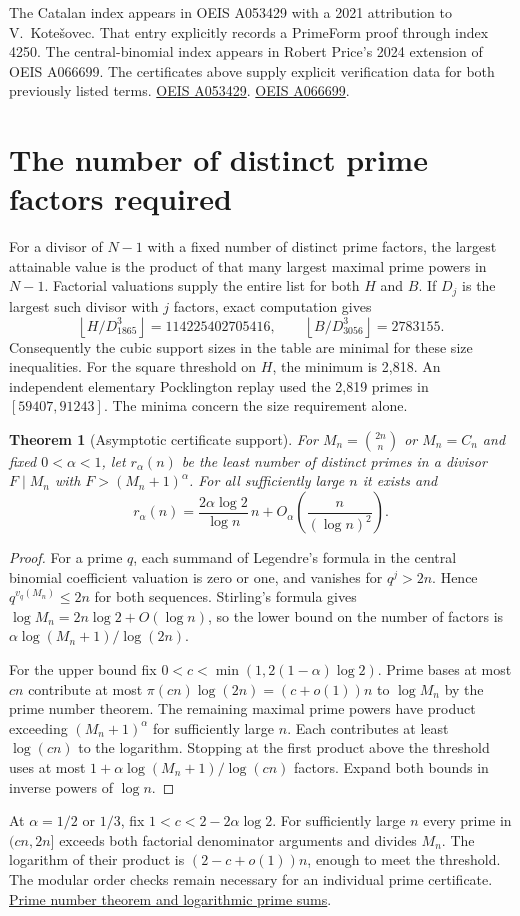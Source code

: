 \documentclass[11pt,a4paper,oneside,openany]{report}
\newtheorem{theorem}{Theorem}[chapter]
\begin{document}
The Catalan index appears in OEIS A053429 with a 2021 attribution to V.~Kote\v{s}ovec. That entry explicitly records a PrimeForm proof through index 4250. The central-binomial index appears in Robert Price's 2024 extension of OEIS A066699. The certificates above supply explicit verification data for both previously listed terms. \href{https://oeis.org/A053429}{OEIS A053429}. \href{https://oeis.org/A066699}{OEIS A066699}.

\section{The number of distinct prime factors required}

For a divisor of $N-1$ with a fixed number of distinct prime factors, the largest attainable value is the product of that many largest maximal prime powers in $N-1$. Factorial valuations supply the entire list for both $H$ and $B$. If $D_j$ is the largest such divisor with $j$ factors, exact computation gives
\[
 \left\lfloor H/D_{1865}^3\right\rfloor=114225402705416,
 \qquad \left\lfloor B/D_{3056}^3\right\rfloor=2783155 .
\]
Consequently the cubic support sizes in the table are minimal for these size inequalities. For the square threshold on $H$, the minimum is 2,818. An independent elementary Pocklington replay used the 2,819 primes in $[59407,91243]$. The minima concern the size requirement alone.

\begin{theorem}[Asymptotic certificate support]\label{cer:support}
For $M_n=\binom{2n}{n}$ or $M_n=C_n$ and fixed $0<\alpha<1$, let $r_\alpha(n)$ be the least number of distinct primes in a divisor $F\mid M_n$ with $F>(M_n+1)^\alpha$. For all sufficiently large $n$ it exists and
\[
 r_\alpha(n)=\frac{2\alpha\log2}{\log n}\,n
             +O_\alpha\!\left(\frac{n}{(\log n)^2}\right).
\]
\end{theorem}
\begin{proof}
For a prime $q$, each summand of Legendre's formula in the central binomial coefficient valuation is zero or one, and vanishes for $q^j>2n$. Hence $q^{v_q(M_n)}\le2n$ for both sequences. Stirling's formula gives $\log M_n=2n\log2+O(\log n)$, so the lower bound on the number of factors is $\alpha\log(M_n+1)/\log(2n)$.

For the upper bound fix $0<c<\min(1,2(1-\alpha)\log2)$. Prime bases at most $cn$ contribute at most $\pi(cn)\log(2n)=(c+o(1))n$ to $\log M_n$ by the prime number theorem. The remaining maximal prime powers have product exceeding $(M_n+1)^\alpha$ for sufficiently large $n$. Each contributes at least $\log(cn)$ to the logarithm. Stopping at the first product above the threshold uses at most $1+\alpha\log(M_n+1)/\log(cn)$ factors. Expand both bounds in inverse powers of $\log n$.
\end{proof}
At $\alpha=1/2$ or $1/3$, fix $1<c<2-2\alpha\log2$. For sufficiently large $n$ every prime in $(cn,2n]$ exceeds both factorial denominator arguments and divides $M_n$. The logarithm of their product is $(2-c+o(1))n$, enough to meet the threshold. The modular order checks remain necessary for an individual prime certificate. \href{https://math.mit.edu/classes/18.785/2019fa/LectureNotes16.pdf}{Prime number theorem and logarithmic prime sums}.
\end{document}
